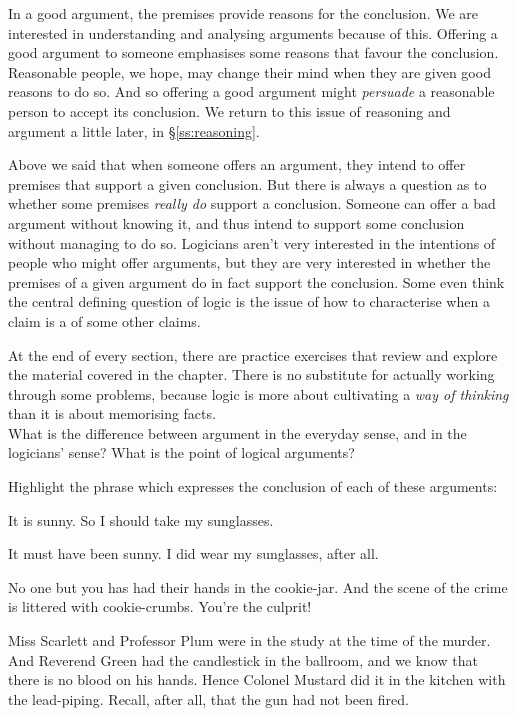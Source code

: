 In a good argument, the premises provide reasons for the conclusion. We are interested in understanding and analysing arguments because of this. Offering a good argument to someone emphasises some reasons that favour the conclusion. Reasonable people, we hope, may change their mind when they are given good reasons to do so. And so offering a good argument might \emph{persuade} a reasonable person to accept its conclusion. We return to this issue of reasoning and argument a little later, in §\ref{ss:reasoning}.

Above we said that when someone offers an argument, they intend to offer premises that support a given conclusion. But there is always a question as to whether some premises \emph{really do} support a conclusion. Someone can offer a bad argument without knowing it, and thus intend to support some conclusion without managing to do so. Logicians aren't very interested in the intentions of people who might offer arguments, but they are very interested in whether the premises of a given argument do in fact support the conclusion. Some even think the central defining question of logic is the issue of how to characterise when a claim is a  of some other claims.




\practiceproblems
At the end of every section, there are practice exercises that review and explore the material covered in the chapter. There is no substitute for actually working through some problems, because logic is more about cultivating a \emph{way of thinking} than it is about memorising facts.\\[12pt]

\problempart What is the difference between argument in the everyday sense, and in the logicians’ sense? What is the point of logical arguments?

\problempart 
Highlight the phrase which expresses the conclusion of each of these arguments:
\begin{earg}
	\item It is sunny. So I should take my sunglasses.
	\item It must have been sunny. I did wear my sunglasses, after all.
	\item No one but you has had their hands in the cookie-jar. And the scene of the crime is littered with cookie-crumbs. You're the culprit!
	\item Miss Scarlett and Professor Plum were in the study at the time of the murder. And Reverend Green had the candlestick in the ballroom, and we know that there is no blood on his hands. Hence Colonel Mustard did it in the kitchen with the lead-piping. Recall, after all, that the gun had not been fired.
\end{earg}


